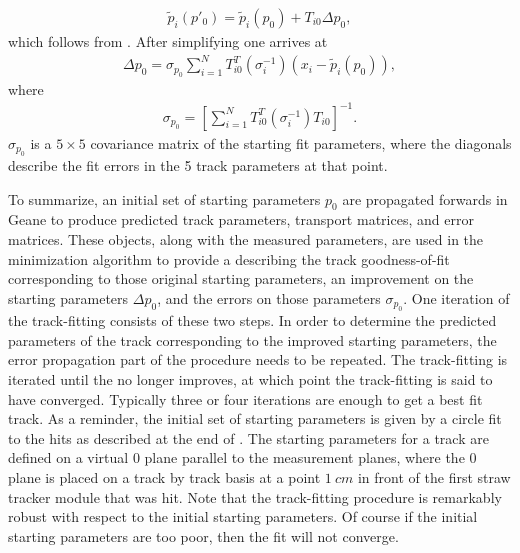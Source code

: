     \begin{align} \label{eq:psub}
        \widetilde{p}_{i}(p'_{0}) = \widetilde{p}_{i}(p_{0}) + T_{i0} \Delta p_{0},
    \end{align}
which follows from . After simplifying one arrives at 
    \begin{align} \label{eq:deltap}
        \Delta p_{0} = \sigma_{p_{0}} \sum_{i=1}^{N} T^{T}_{i0}(\sigma_{i}^{-1})(x_{i} - \widetilde{p}_{i}(p_{0})),
    \end{align}
where
    \begin{align} \label{eq:cov}
        \sigma_{p_{0}} = [\sum_{i=1}^{N} T^{T}_{i0} (\sigma_{i}^{-1}) T_{i0} ]^{-1}.
    \end{align}
$\sigma_{p_{0}}$ is a $5 \times 5$ covariance matrix of the starting fit parameters, where the diagonals describe the fit errors in the 5 track parameters at that point. 

To summarize, an initial set of starting parameters $p_{0}$ are propagated forwards in Geane to produce predicted track parameters, transport matrices, and error matrices. These objects, along with the measured parameters, are used in the \chisq minimization algorithm to provide a \chisq describing the track goodness-of-fit corresponding to those original starting parameters, an improvement on the starting parameters $\Delta p_{0}$, and the errors on those parameters $\sigma_{p_{0}}$. One iteration of the track-fitting consists of these two steps. In order to determine the predicted parameters of the track corresponding to the improved starting parameters, the error propagation part of the procedure needs to be repeated. The track-fitting is iterated until the \chisq no longer improves, at which point the track-fitting is said to have converged. Typically three or four iterations are enough to get a best fit track. As a reminder, the initial set of starting parameters is given by a circle fit to the hits as described at the end of . The starting parameters for a track are defined on a virtual $0$ plane parallel to the measurement planes, where the $0$ plane is placed on a track by track basis at a point $\SI{1}{cm}$ in front of the first straw tracker module that was hit. Note that the track-fitting procedure is remarkably robust with respect to the initial starting parameters. Of course if the initial starting parameters are too poor, then the fit will not converge. 


